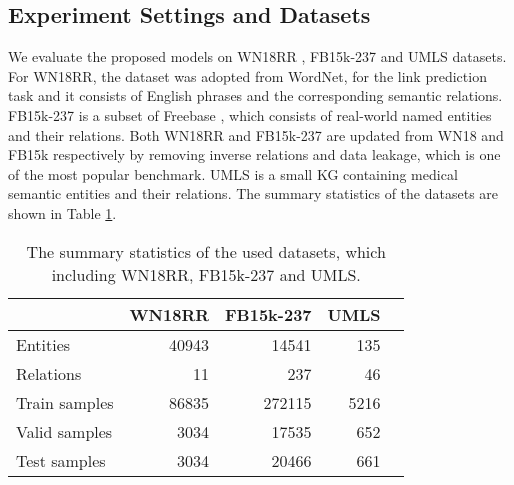 \documentclass[journal]{IEEEtran}
\begin{document}
\subsection{Experiment Settings and Datasets}

We evaluate the proposed models on WN18RR \cite{dettmers2018convolutional}, FB15k-237 \cite{toutanova2015representing} and UMLS \cite{dettmers2018convolutional} datasets. For WN18RR, the dataset was adopted from WordNet, for the link prediction task \cite{miller1998wordnet} and it consists of English phrases and the corresponding semantic relations. FB15k-237 \cite{toutanova2015representing} is a subset of Freebase \cite{bollacker2008freebase}, which consists of real-world named entities and their relations. Both WN18RR and FB15k-237 are updated from WN18 and FB15k \cite{bordes2013translating} respectively by removing inverse relations and data leakage, which is one of the most popular benchmark. UMLS \cite{dettmers2018convolutional} is a small KG containing medical semantic entities and their relations. The summary statistics of the datasets are shown in Table \ref{tab:test4}.

\begin{table}[htbp]
	\small
	\vspace{-0.3cm}
				\centering
		\caption{\label{tab:test4} The summary statistics of the used datasets, which including WN18RR, FB15k-237 and UMLS.}
		\begin{tabular}{l|rrrr}

			\toprule
			 & WN18RR & FB15k-237 & UMLS \\
			\midrule
			Entities & 40943 & 14541 & 135\\
			Relations & 11 & 237 & 46\\
			Train samples & 86835 & 272115 & 5216 \\
			Valid samples & 3034 & 17535 & 652 \\
			Test samples & 3034 & 20466 & 661 \\
			\bottomrule
	\end{tabular}


	\vspace{-0.3cm}
\end{table}
\end{document}
